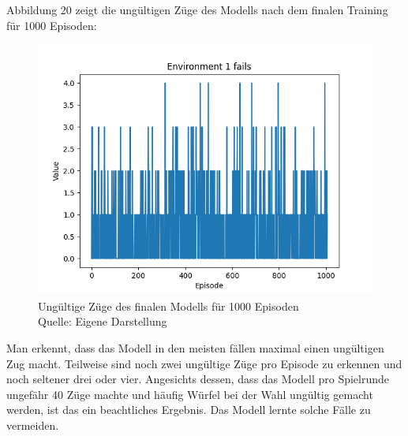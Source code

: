 Abbildung 20 zeigt die ungültigen Züge des Modells nach dem finalen Training für 1000 Episoden:
\nopagebreak
\begin{figure}[H]
	\includegraphics[width=1\textwidth]{Bilder/maskableppo_ganzschoenclever_193avg_v3.1f} 
	\caption[Ungültige Züge des finalen Modells für 1000 Episoden]{Ungültige Züge des finalen Modells für 1000 Episoden\\ Quelle: Eigene Darstellung}
\end{figure}

Man erkennt, dass das Modell in den meisten fällen maximal einen ungültigen Zug macht. Teilweise sind noch zwei ungültige Züge pro Episode zu erkennen und noch seltener drei oder vier. Angesichts dessen, dass das Modell pro Spielrunde ungefähr 40 Züge machte und häufig Würfel bei der Wahl ungültig gemacht werden, ist das ein beachtliches Ergebnis. Das Modell lernte solche Fälle zu vermeiden.\\

